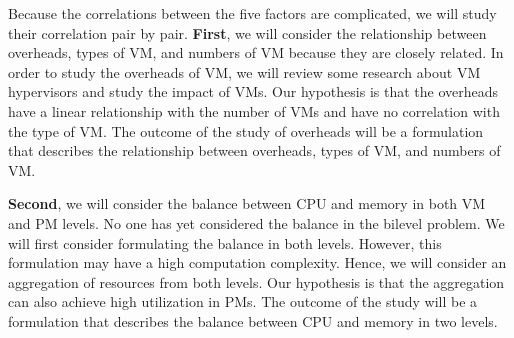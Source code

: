 \begin{enumerate}

	 Because the correlations between the five factors are complicated, we will study their correlation pair by pair. 
	\textbf{First}, we will consider the relationship between overheads, types of VM, and numbers of VM because they are closely related. In order to study the overheads of VM, we will review some research about VM hypervisors and study the impact of VMs. Our hypothesis is that the overheads have a linear relationship with the number of VMs and have no correlation with the type of VM. The outcome of the study of overheads will be a formulation that describes the relationship between overheads, types of VM, and numbers of VM.

	\textbf{Second}, we will consider the balance between CPU and memory in both VM and PM levels. No one has yet considered the balance in the bilevel problem. We 
	will first consider formulating the balance in both levels. However, this formulation may have a high computation complexity. Hence, we will consider an aggregation of resources from both levels. Our hypothesis is that the aggregation can also achieve high utilization in PMs. The outcome of the study will be a formulation that describes the balance between CPU and memory in two levels.


\end{enumerate}
